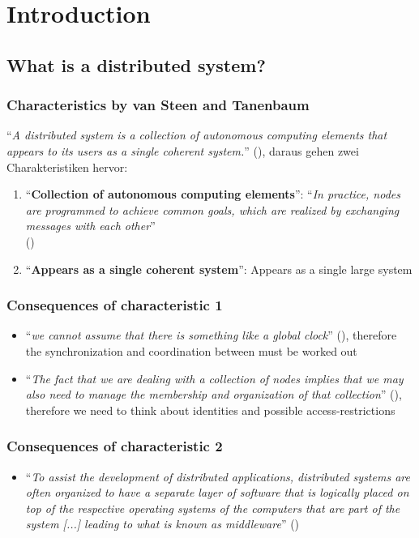 \documentclass[12pt,A4]{extarticle}
\begin{document}
\disclaimer

\tableofcontents
\clearpage

\section{Introduction}
\subsection{What is a distributed system?}
\subsubsection{Characteristics by van Steen and Tanenbaum}
``\textit{A distributed system is a collection of autonomous computing elements that appears to its users as a single coherent system.}'' (\cite{DBLP:journals/computing/SteenT16}), daraus gehen zwei Charakteristiken hervor:
\begin{enumerate}
  \item{``\textbf{Collection of autonomous computing elements}'': ``\textit{In practice, nodes are programmed to achieve common goals, which are realized by exchanging messages with each other}'' \\(\cite{DBLP:journals/computing/SteenT16})}
  \item{``\textbf{Appears as a single coherent system}'': Appears as a single large system}
\end{enumerate}

\subsubsection{Consequences of characteristic 1}
\begin{itemize}
  \item{``\textit{we cannot assume that there is something like a global clock}'' (\cite{DBLP:journals/computing/SteenT16}), therefore the synchronization and coordination between must be worked out}
  \item{``\textit{The fact that we are dealing with a collection of nodes implies that we may also need to manage the membership and organization of that collection}'' (\cite{DBLP:journals/computing/SteenT16}), therefore we need to think about identities and possible access-restrictions}
\end{itemize}

\subsubsection{Consequences of characteristic 2}
\begin{itemize}
  \item{``\textit{To assist the development of distributed applications, distributed systems are often organized to have a separate layer of software that is logically placed on top of the respective operating systems of the computers that are part of the system [...] leading to what is known as middleware}'' (\cite{DBLP:journals/computing/SteenT16})}
\end{itemize}
\end{document}
